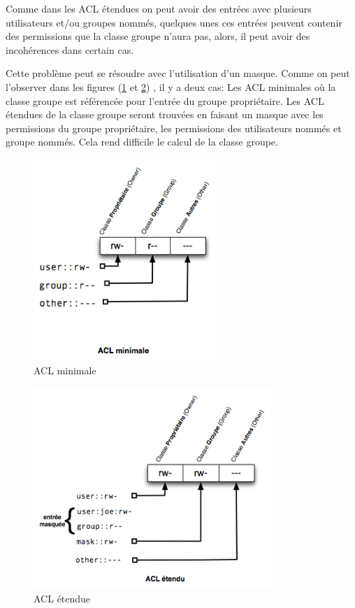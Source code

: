 \documentclass{article}
\begin{document}
Comme dans les ACL étendues on peut avoir des entrées avec plusieurs utilisateurs et/ou groupes nommés, quelques unes ces entrées peuvent contenir des permissions que la classe groupe n'aura pas, alors, il peut avoir des incohérences dans certain cas. 


Cette problème peut se résoudre avec l'utilisation d'un masque. Comme on peut l'observer dans les figures (\ref{fig:img_acl-mapping1} et \ref{fig:img_acl-mapping2}) , il y a deux cas:  Les ACL minimales où la classe groupe est référencée pour l'entrée du groupe propriétaire. Les ACL étendues de la classe groupe seront trouvées en faisant un masque avec les permissions du groupe propriétaire, les permissions des utilisateurs nommés et groupe nommés. Cela rend difficile le calcul de la classe groupe. 

\begin{figure}[htbp]
\centering
\includegraphics[height=3in]{img/acl-mapping-min.jpg}
\caption{ACL minimale}
\label{fig:img_acl-mapping1}
\end{figure}
 

\begin{figure}[htbp]
\centering
\includegraphics[height=3in]{img/acl-mapping-etendu.jpg}
\caption{ACL étendue}
\label{fig:img_acl-mapping2}
\end{figure}
\end{document}
